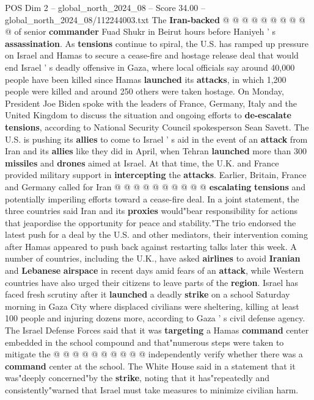 \begin{textsample}{POS Dim 2 – global\_north\_2024\_08 – Score 34.00 – global\_north\_2024\_08/112244003.txt}
The \textbf{Iran-backed} @ @ @ @ @ @ @ @ @ @ of senior \textbf{commander} Fuad Shukr in Beirut hours before Haniyeh ' s \textbf{assassination}.
As \textbf{tensions} continue to spiral, the U.S. has ramped up pressure on Israel and Hamas to secure a cease-fire and hostage release deal that would end Israel ' s deadly offensive in Gaza, where local officials say around 40,000 people have been killed since Hamas \textbf{launched} its \textbf{attacks}, in which 1,200 people were killed and around 250 others were taken hostage.
On Monday, President Joe Biden spoke with the leaders of France, Germany, Italy and the United Kingdom to discuss the situation and ongoing efforts to \textbf{de-escalate} \textbf{tensions}, according to National Security Council spokesperson Sean Savett.
The U.S. is pushing its \textbf{allies} to come to Israel ' s aid in the event of an \textbf{attack} from Iran and its \textbf{allies} like they did in April, when Tehran \textbf{launched} more than 300 \textbf{missiles} and \textbf{drones} aimed at Israel.
At that time, the U.K. and France provided military support in \textbf{intercepting} the \textbf{attacks}.
Earlier, Britain, France and Germany called for Iran @ @ @ @ @ @ @ @ @ @ \textbf{escalating} \textbf{tensions} and potentially imperiling efforts toward a cease-fire deal.
In a joint statement, the three countries said Iran and its \textbf{proxies} would"bear responsibility for actions that jeapordise the opportunity for peace and stability."The trio endorsed the latest push for a deal by the U.S. and other mediators, their intervention coming after Hamas appeared to push back against restarting talks later this week.
A number of countries, including the U.K., have asked \textbf{airlines} to avoid \textbf{Iranian} and \textbf{Lebanese} \textbf{airspace} in recent days amid fears of an \textbf{attack}, while Western countries have also urged their citizens to leave parts of the \textbf{region}.
Israel has faced fresh scrutiny after it \textbf{launched} a deadly \textbf{strike} on a school Saturday morning in Gaza City where displaced civilians were sheltering, killing at least 100 people and injuring dozens more, according to Gaza ' s civil defense agency.
The Israel Defense Forces said that it was \textbf{targeting} a Hamas \textbf{command} center embedded in the school compound and that"numerous steps were taken to mitigate the @ @ @ @ @ @ @ @ @ @ independently verify whether there was a \textbf{command} center at the school.
The White House said in a statement that it was"deeply concerned"by the \textbf{strike}, noting that it has"repeatedly and consistently"warned that Israel must take measures to minimize civilian harm.

\end{textsample}
